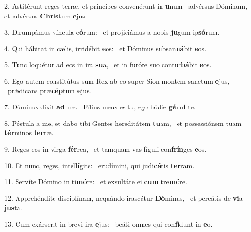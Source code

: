 2. Astitérunt reges terræ, et príncipes convenérunt in \textbf{u}num \ast\  advérsus Dóminum, et advérsus \textbf{Chris}tum \textbf{e}jus.\

3. Dirumpámus víncula e\textbf{ó}rum: \ast\  et projiciámus a nobis \textbf{ju}gum ip\textbf{só}rum.\

4. Qui hábitat in cælis, irridébit \textbf{e}os: \ast\  et Dóminus subsan\textbf{ná}bit \textbf{e}os.\

5. Tunc loquétur ad eos in ira \textbf{su}a, \ast\  et in furóre suo contur\textbf{bá}bit \textbf{e}os.\

6. Ego autem constitútus sum Rex ab eo super Sion montem sanctum \textbf{e}jus, \ast\  prǽdicans præ\textbf{cép}tum \textbf{e}jus.\

7. Dóminus dixit \textbf{ad} me: \ast\  Fílius meus es tu, ego hódie \textbf{gé}nu\textbf{i} te.\

8. Póstula a me, et dabo tibi Gentes hereditátem \textbf{tu}am, \ast\  et possessiónem tuam \textbf{tér}minos \textbf{ter}ræ.\

9. Reges eos in virga \textbf{fér}rea, \ast\  et tamquam vas fíguli con\textbf{frín}ges \textbf{e}os.\

10. Et nunc, reges, intel\textbf{lí}gite: \ast\  erudímini, qui judi\textbf{cá}tis \textbf{ter}ram.\

11. Servíte Dómino in ti\textbf{mó}re: \ast\  et exsultáte ei \textbf{cum} tre\textbf{mó}re.\

12. Apprehéndite disciplínam, nequándo irascátur \textbf{Dó}minus, \ast\  et pereátis de \textbf{vi}a \textbf{jus}ta.\

13. Cum exárserit in brevi ira \textbf{e}jus: \ast\  beáti omnes qui con\textbf{fí}dunt in \textbf{e}o.\

